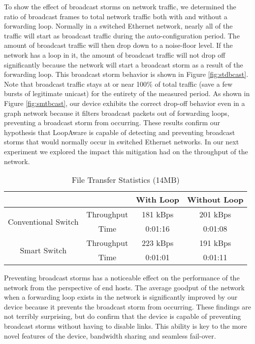 	To show the effect of broadcast storms on network traffic, we determined the ratio of broadcast frames to total network traffic both with and without a forwarding loop.
	Normally in a switched Ethernet network, nearly all of the traffic will start as broadcast traffic during the auto-configuration period.
	The amount of broadcast traffic will then drop down to a noise-floor level.
	If the network has a loop in it, the amount of broadcast traffic will not drop off significantly because the network will start a broadcast storm as a result of the forwarding loop.
	This broadcast storm behavior is shown in Figure \ref{fig:stdbcast}.
	Note that broadcast traffic stays at or near 100\% of total traffic (save a few bursts of legitimate unicast) for the entirety of the measured period. 
	As shown in Figure \ref{fig:smtbcast}, our device exhibits the correct drop-off behavior even in a graph network because it filters broadcast packets out of forwarding loops, preventing a broadcast storm from occurring.
	These results confirm our hypothesis that LoopAware is capable of detecting and preventing broadcast storms that would normally occur in switched Ethernet networks.
	In our next experiment we explored the impact this mitigation had on the throughput of the network.

	\begin{table}[ht]
		\centering
		\caption{File Transfer Statistics (14MB)}
		\label{tab:throughput}
		\begin{tabular}{|c|c|c|c|}
			\hline
			\multicolumn{2}{|c|}{} & With Loop	& Without Loop \\
			\hline
			\multirow{2}{*}{Conventional Switch}& Throughput	& 181 kBps	& 201 kBps \\ \cline{2-4}
			& Time	& 0:01:16	& 0:01:08 \\
			\hline
			\multirow{2}{*}{Smart Switch}	& Throughput	& 223 kBps	& 191 kBps \\ \cline{2-4}
			& Time	& 0:01:01	& 0:01:11\\
			\hline
		\end{tabular}
	\end{table}

	Preventing broadcast storms has a noticeable effect on the performance of the network from the perspective of end hosts.
	The average goodput of the network when a forwarding loop exists in the network is significantly improved by our device because it prevents the broadcast storm from occurring.
	These findings are not terribly surprising, but do confirm that the device is capable of preventing broadcast storms without having to disable links.
	This ability is key to the more novel features of the device, bandwidth sharing and seamless fail-over.

